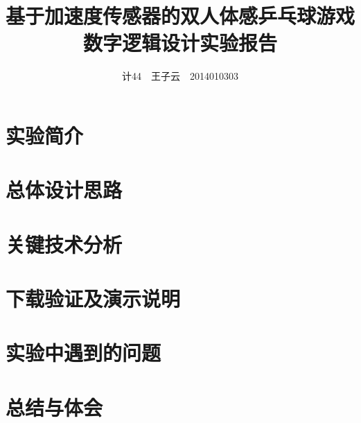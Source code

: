 \documentclass[UTF8]{article}
\title{基于加速度传感器的双人体感乒乓球游戏\\
数字逻辑设计实验报告}
\author{计44~~王子云~~2014010303\\
}
\date{ }
\begin{document}
\maketitle
\newpage

\section{实验简介}

\section{总体设计思路}

\section{关键技术分析}

\section{下载验证及演示说明}

\section{实验中遇到的问题}

\section{总结与体会}
\end{document}
